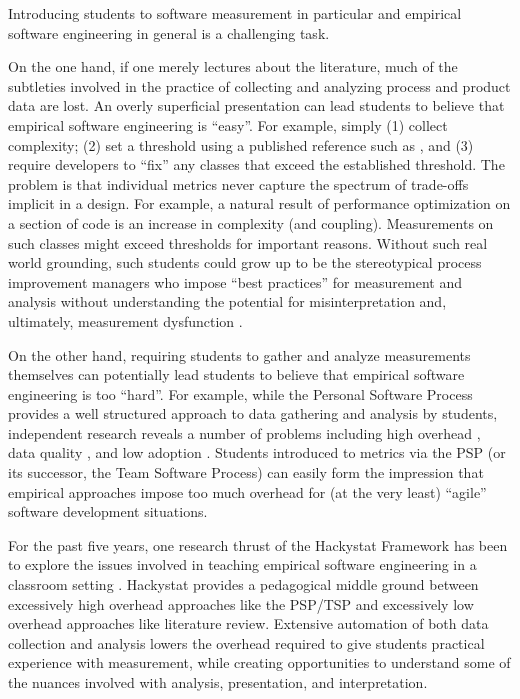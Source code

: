 \documentclass[times,10pt,twocolumn]{article}
\begin{document}

Introducing students to software measurement in particular and empirical
software engineering in general is a challenging task.  

On the one hand, if one merely lectures about the literature, much of the
subtleties involved in the practice of collecting and analyzing process and
product data are lost.  An overly superficial presentation can lead
students to believe that empirical software engineering is ``easy''. For example,
simply (1) collect complexity; (2) set a threshold using a published
reference such as \cite{Clark08}, and (3) require developers to ``fix'' any
classes that exceed the established threshold.  The problem is that
individual metrics never capture the spectrum of trade-offs implicit in a
design. For example, a natural result of performance optimization on a
section of code is an increase in complexity (and coupling). Measurements
on such classes might exceed thresholds for important reasons.  Without
such real world grounding, such students could grow up to be the
stereotypical process improvement managers who impose ``best practices''
for measurement and analysis without understanding the potential for
misinterpretation and, ultimately, measurement dysfunction \cite{Austin96}.

On the other hand, requiring students to gather and analyze measurements
themselves can potentially lead students to believe that empirical software
engineering is too ``hard''.  For example, while the Personal Software
Process \cite{Humphrey95} provides a well structured approach to data
gathering and analysis by students, independent research reveals a number
of problems including high overhead \cite{csdl2-01-12}, data quality
\cite{csdl-98-13}, and low adoption \cite{Borstler02}.  Students introduced
to metrics via the PSP (or its successor, the Team Software Process) can
easily form the impression that empirical approaches impose too much
overhead for (at the very least) ``agile'' software development situations.

For the past five years, one research thrust of the Hackystat Framework has
been to explore the issues involved in teaching empirical software
engineering in a classroom setting \cite{csdl2-03-12,csdl2-07-02}.
Hackystat provides a pedagogical middle ground between excessively high
overhead approaches like the PSP/TSP and excessively low overhead
approaches like literature review.  Extensive automation of both data
collection and analysis lowers the overhead required to give students
practical experience with measurement, while creating opportunities to
understand some of the nuances involved with analysis, presentation, and
interpretation.
\end{document}
